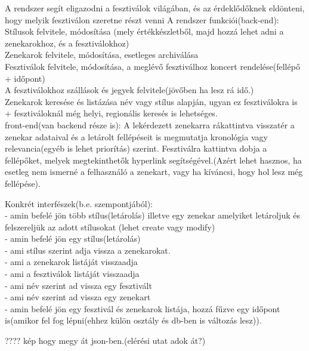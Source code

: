 \documentclass[11pt]{article}
\begin{document}
A rendszer segít eligazodni a fesztiválok világában, és az érdeklődőknek eldönteni, hogy melyik fesztiválon szeretne részt venni
A rendszer funkciói(back-end):\\
Stílusok felvitele, módosítása (mely értékkészletből, majd hozzá lehet adni a zenekarokhoz, és a fesztiválokhoz)\\
Zenekarok felvitele, módosítása, esetleges archiválása\\
Fesztiválok felvitele, módosítása, a meglévő fesztiválhoz koncert rendelése(fellépő + időpont)\\
A fesztiválokhoz szállások és jegyek felvitele(jövőben ha lesz rá idő.)\\
Zenekarok keresése és listázása név vagy stílus alapján, ugyan ez fesztiválokra is + fesztiváloknál még helyi, regionális keresés is lehetséges.\\

front-end(van backend része is):
A lekérdezett zenekarra rákattintva visszatér a zenekar adataival és a letárolt fellépéseit is megmutatja kronológia vagy relevancia(egyéb is lehet priorítás) szerint.
Fesztiválra kattintva dobja a fellépőket, melyek megtekinthetők hyperlink segítségével.(Azért lehet hasznos, ha esetleg nem ismerné a felhasználó a zenekart, vagy ha kíváncsi, hogy hol lesz még fellépése).

Konkrét interfészek(b.e. szempontjából):
\\- amin befelé jön több stílus(letárolás) illetve egy zenekar amelyiket letároljuk és felszereljük az adott stílusokat (lehet create vagy modify)
\\- amin befelé jön egy stílus(letárolás)
\\- ami stílus szerint adja vissza a zenekarokat.
\\- ami a zenekarok listáját visszaadja
\\- ami a fesztiválok listáját visszaadja
\\- ami név szerint ad vissza egy fesztivált
\\- ami név szerint ad vissza egy zenekart
\\- amin befelé jön egy fesztivál és zenekarok listája, hozzá fűzve egy időpont is(amikor fel fog lépni(ehhez külön osztály és db-ben is változás lesz)).
 
????
kép hogy megy át json-ben.(elérési utat adok át?)
\end{document}
